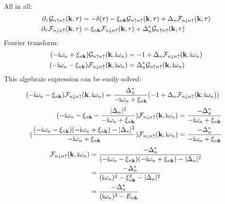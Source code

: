 All in all:
\begin{align}
    \pdif{\tau} \mathcal{G}_{n \uparrow n \uparrow} (\vb{k}, \tau) &= -\delta(\tau) - \xi_{n \vb{k}} \mathcal{G}_{n \uparrow n \uparrow} (\vb{k}, \tau) + \Delta_{n} \mathcal{F}_{n\downarrow n\uparrow} (\vb{k}, \tau) \\
    \pdif{\tau} \mathcal{F}_{n \downarrow n \uparrow} (\vb{k}, \tau) &= \xi_{n \vb{k}} \mathcal{F}_{n \downarrow n \uparrow} (\vb{k}, \tau) + \Delta_{n}^* \mathcal{G}_{n\uparrow n\uparrow} (\vb{k}, \tau)
\end{align}
Fourier transform:
\begin{align}
    (-\mathrm{i} \omega_n + \xi_{n \bm{\mathrm{k}}}) \mathcal{G}_{n \uparrow n \uparrow} (\bm{\mathrm{k}}, \mathrm{i} \omega_n) &= -1 + \Delta_{n} \mathcal{F}_{n\downarrow n\uparrow} (\bm{\mathrm{k}}, \mathrm{i} \omega_n) \\
    (-\mathrm{i} \omega_n - \xi_{n \bm{\mathrm{k}}}) \mathcal{F}_{n \downarrow n \uparrow} (\bm{\mathrm{k}}, \mathrm{i} \omega_n) &= \Delta_{n}^* \mathcal{G}_{n\uparrow n\uparrow} (\bm{\mathrm{k}}, \mathrm{i} \omega_n)
\end{align}
This algebraic expression can be easily solved:
\begin{align}
    (-\mathrm{i} \omega_n - \xi_{n \bm{\mathrm{k}}}) \mathcal{F}_{n \downarrow n \uparrow} (\bm{\mathrm{k}}, \mathrm{i} \omega_n) &= \frac{\Delta_{n}^*}{-\mathrm{i} \omega_n + \xi_{n \bm{\mathrm{k}}}} (-1 + \Delta_{n} \mathcal{F}_{n\downarrow n\uparrow} (\bm{\mathrm{k}}, \mathrm{i} \omega_n))
\end{align}
\begin{align}
    (-\mathrm{i} \omega_n - \xi_{n \bm{\mathrm{k}}} - \frac{\vert\Delta_{n}\vert^2}{-\mathrm{i} \omega_n + \xi_{n \bm{\mathrm{k}}}}) \mathcal{F}_{n \downarrow n \uparrow} (\bm{\mathrm{k}}, \mathrm{i} \omega_n) &= \frac{-\Delta_{n}^*}{-\mathrm{i} \omega_n + \xi_{n \bm{\mathrm{k}}}} \\
    (\frac{(-\mathrm{i} \omega_n - \xi_{n \bm{\mathrm{k}}} )(-\mathrm{i} \omega_n + \xi_{n \bm{\mathrm{k}}}) - \vert\Delta_{n}\vert^2}{-\mathrm{i} \omega_n + \xi_{n \bm{\mathrm{k}}}}) \mathcal{F}_{n \downarrow n \uparrow} (\bm{\mathrm{k}}, \mathrm{i} \omega_n) &= \frac{-\Delta_{n}^*}{-\mathrm{i} \omega_n + \xi_{n \bm{\mathrm{k}}}}
\end{align}
\begin{align}
    \mathcal{F}_{n \downarrow n \uparrow} (\bm{\mathrm{k}}, \mathrm{i} \omega_n) &= \frac{-\Delta_{n}^*}{(-\mathrm{i} \omega_n - \xi_{n \bm{\mathrm{k}}} )(-\mathrm{i} \omega_n + \xi_{n \bm{\mathrm{k}}}) - \vert\Delta_{n}\vert^2} \\
    &= \frac{-\Delta_{n}^*}{(\mathrm{i} \omega_n)^2 - \xi_{n \bm{\mathrm{k}}}^2 - \vert\Delta_{n}\vert^2} \\
    &= \frac{-\Delta_{n}^*}{(\mathrm{i} \omega_n)^2 - E_{n \bm{\mathrm{k}}}}
\end{align}
